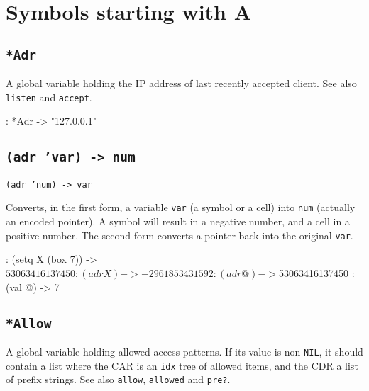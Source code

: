 %
%
%

\chapter{Symbols starting with A}
\label{cha:func-ref-A-symbols-starting-with-A}

 
\section*{\texttt{*Adr}}
\label{sec:func-ref-A-*Adr}


A global variable holding the IP address of last recently accepted
client. See also \texttt{listen} and \texttt{accept}.


\begin{wideverbatim}
: *Adr
-> "127.0.0.1"
\end{wideverbatim}

 
\section*{\texttt{(adr 'var) -> num}}
\label{sec:func-ref-A-(adr 'var) -> num}


\texttt{(adr 'num) -> var}

Converts, in the first form, a variable \texttt{var} (a symbol or a cell) into
\texttt{num} (actually an encoded pointer). A symbol will result in a negative
number, and a cell in a positive number. The second form converts a
pointer back into the original \texttt{var}.


\begin{wideverbatim}
: (setq X (box 7))
-> $53063416137450
: (adr X)
-> -2961853431592
: (adr @)
-> $53063416137450
: (val @)
-> 7
\end{wideverbatim}

 
\section*{\texttt{*Allow}}
\label{sec:func-ref-A-*Allow}


A global variable holding allowed access patterns. If its value is
non-\texttt{NIL}, it should contain a list where the CAR is an \texttt{idx} tree of
allowed items, and the CDR a list of prefix strings. See also \texttt{allow},
\texttt{allowed} and \texttt{pre?}.


